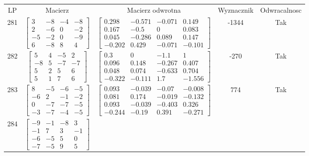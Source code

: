 \documentclass[a4paper,12pt]{article}
\begin{document}
\bgroup {} \vspace{0.2in} \begin{tabular}{c c c c c}
LP & Macierz & Macierz odwrotna & Wyznacznik & Odwracalnosc\\
281
&
$\begin{bmatrix} 3 & -8 & -4 & -8 \\ 2 & -6 & 0 & -2 \\ -5 & -2 & 0 & -9 \\ 6 & -8 & 8 & 4 \end{bmatrix}$
&
$\begin{bmatrix} 0.298 & -0.571 & -0.071 & 0.149 \\ 0.167 & -0.5 & 0 & 0.083 \\ 0.045 & -0.286 & 0.089 & 0.147 \\ -0.202 & 0.429 & -0.071 & -0.101 \end{bmatrix}$
&
-1344
&
Tak
\\
282
&
$\begin{bmatrix} 5 & 4 & -5 & 2 \\ -8 & 5 & -7 & -7 \\ 5 & 2 & 5 & 6 \\ 5 & 1 & 7 & 6 \end{bmatrix}$
&
$\begin{bmatrix} 0.3 & 0 & -1.1 & 1 \\ 0.096 & 0.148 & -0.267 & 0.407 \\ 0.048 & 0.074 & -0.633 & 0.704 \\ -0.322 & -0.111 & 1.7 & -1.556 \end{bmatrix}$
&
-270
&
Tak
\\
283
&
$\begin{bmatrix} 8 & -5 & -6 & -5 \\ -6 & 2 & -1 & -2 \\ 0 & -7 & -7 & -5 \\ -3 & -7 & -4 & -5 \end{bmatrix}$
&
$\begin{bmatrix} 0.093 & -0.039 & -0.07 & -0.008 \\ 0.081 & 0.174 & -0.019 & -0.132 \\ 0.093 & -0.039 & -0.403 & 0.326 \\ -0.244 & -0.19 & 0.391 & -0.271 \end{bmatrix}$
&
774
&
Tak
\\
284
&
$\begin{bmatrix} -9 & -1 & -8 & 3 \\ -1 & 7 & 3 & -1 \\ -6 & -5 & 5 & 0 \\ -7 & -5 & 9 & 5 \end{bmatrix}$

\end{tabular}
\end{document}
